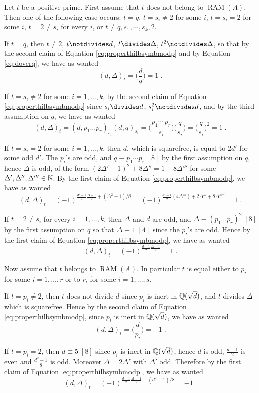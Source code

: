 \documentclass[11pt]{article}
\begin{document}
\medskip
Let $t$ be a positive prime. First assume that $t$ does not belong to
$\operatorname{RAM}(A)$. Then one of the following case occurs: $t=q$,
$t=s_i\neq 2$ for some $i$, $t=s_i= 2$ for some $i$, $t=2\neq s_i$ for
every $i$, or $t\neq q,s_1,\cdots, s_k,2$.

If $t=q$, then $t\neq 2$, $t\notdivides d$, $t\divides \Delta$,
$t^2\notdivides \Delta$, so that by the second claim of Equation
\eqref{eq:properthilbsymbmodp} and by Equation \eqref{eq:doverq}, we
have as wanted
$$
(d,\Delta)_t=\big(\frac{d}{q}\big)=1\;.
$$ 

If $t= s_i\neq 2$ for some $i=1,\dots, k$, by the second claim of
Equation \eqref{eq:properthilbsymbmodp} since $s_i\divides d$,
$s_i^2\notdivides d$, and by the third assumption on $q$, we have as
wanted
$$
(d,\Delta)_t=(d,p_1\dots p_r)_{s_i}(d,q)_{s_i}=
\big(\frac{p_1\cdots\, p_r} {s_i}\big)\big(\frac{q}{s_i}\big)=
\big(\frac{q}{s_i}\big)^2=1\;.
$$ 

If $t= s_i = 2$ for some $i=1,\dots, k$, then $d$, which is
squarefree, is equal to $2d'$ for some odd $d'$.  The $p_i$'s are odd,
and $q\equiv p_1\cdots p_r\;[8]$ by the first assumption on $q$, hence
$\Delta$ is odd, of the form $(2\Delta'+1)^2+8\Delta''=1+8\Delta'''$
for some $\Delta', \Delta'', \Delta'''\in{\mathbb N}$. By the first claim of
Equation \eqref{eq:properthilbsymbmodp}, we have as wanted
$$
(d,\Delta)_t=(-1)^{\frac{d'-1}{2}\frac{\Delta-1}{2}+ (\Delta^2-1)/8}=
(-1)^{\frac{d'-1}{2}(4\Delta''')+ 2\Delta'''+8{\Delta'''}^2}=1\;.
$$ 

If $t=2\neq s_i$ for every $i=1,\dots, k$, then $\Delta$ and $d$ are
odd, and $\Delta\equiv (p_1\dots p_r)^2 \;[8]$ by the first assumption
on $q$ so that $\Delta\equiv 1\; [4]$ since the $p_i$'s are odd. Hence by
the first claim of Equation \eqref{eq:properthilbsymbmodp}, we have as
wanted
$$
(d,\Delta)_t=(-1)^{\frac{d-1}{2}\frac{\Delta-1}{2}}=1\;.
$$ 

\medskip
Now assume that $t$ belongs to $\operatorname{RAM}(A)$. In particular
$t$ is equal either to $p_i$ for some $i=1,\dots, r$ or to $r_i$ for
some $i=1,\dots, s$.

If $t=p_i\neq 2$, then $t$ does not divide $d$ since $p_i$ is inert in
${\mathbb Q}(\sqrt{d})$, and $t$ divides $\Delta$ which is squarefree. Hence
by the second claim of Equation \eqref{eq:properthilbsymbmodp}, since
$p_i$ is inert in ${\mathbb Q}(\sqrt{d})$, we have as wanted
$$
(d,\Delta)_t= \big(\frac{d}{p_i}\big)=-1\;.
$$ 

If $t=p_i= 2$, then $d\equiv 5\;[8]$ since $p_i$ is inert in
${\mathbb Q}(\sqrt{d})$, hence $d$ is odd, $\frac{d-1}{2}$ is even and
$\frac{d^2-1}8$ is odd. Moreover $\Delta=2\Delta'$ with $\Delta'$ odd.
Therefore by the first claim of Equation
\eqref{eq:properthilbsymbmodp}, we have as wanted
$$
(d,\Delta)_t= (-1)^{\frac{d-1}{2}\frac{\Delta'-1}{2}+ (d^2-1)/8}=-1\;.
$$ 
\end{document}
